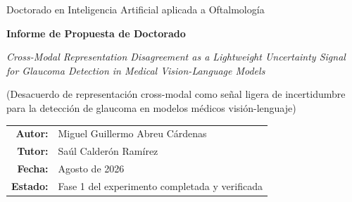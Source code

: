 \documentclass[12pt,a4paper]{article}
\begin{document}
\begin{titlepage}
    \centering
    \vspace*{1.5cm}
    {\large Doctorado en Inteligencia Artificial aplicada a Oftalmología\par}
    \vspace{1.2cm}
    {\LARGE\bfseries Informe de Propuesta de Doctorado\par}
    \vspace{0.8cm}
    {\large\itshape Cross-Modal Representation Disagreement as a Lightweight
    Uncertainty Signal for Glaucoma Detection in Medical Vision-Language Models\par}
    \vspace{0.6cm}
    {\large (Desacuerdo de representación cross-modal como señal ligera de
    incertidumbre para la detección de glaucoma en modelos médicos
    visión-lenguaje)\par}
    \vfill
    \begin{tabular}{rl}
        \textbf{Autor:} & Miguel Guillermo Abreu Cárdenas \\
        \textbf{Tutor:} & Saúl Calderón Ramírez \\
        \textbf{Fecha:} & Agosto de 2026 \\
        \textbf{Estado:} & Fase 1 del experimento completada y verificada \\
    \end{tabular}
    \vspace{1.5cm}
\end{titlepage}
\end{document}
